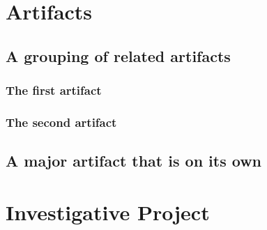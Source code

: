 \documentclass{scrbook}
\begin{document}
  \chapter{Artifacts}


  \section{A grouping of related artifacts}
  \subsection{The first artifact}
  \subsection{The second artifact}

  \section{A major artifact that is on its own}
  \chapter{Investigative Project}

\end{document}
